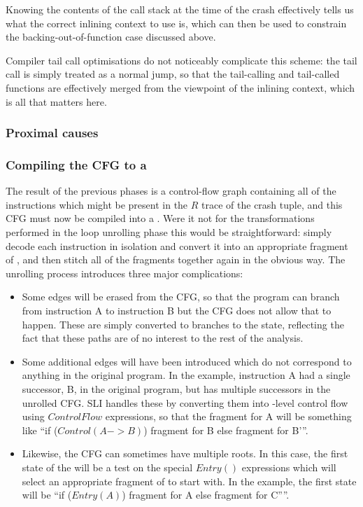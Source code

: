 Knowing the contents of the call stack at the time of the crash
effectively tells us what the correct inlining context to use is,
which can then be used to constrain the backing-out-of-function case
discussed above.

Compiler tail call optimisations do not noticeably complicate this
scheme: the tail call is simply treated as a normal jump, so that the
tail-calling and tail-called functions are effectively merged from the
viewpoint of the inlining context, which is all that matters here.

\subsubsection{Proximal causes}

\subsubsection{Compiling the CFG to a \StateMachine}

The result of the previous phases is a control-flow graph containing
all of the instructions which might be present in the $R$ trace of the
crash tuple, and this CFG must now be compiled into a \StateMachine.
Were it not for the transformations performed in the loop unrolling
phase this would be straightforward: simply decode each instruction in
isolation and convert it into an appropriate fragment of
\StateMachine, and then stitch all of the fragments together again in
the obvious way.  The unrolling process introduces three major
complications:

\begin{itemize}
\item
  Some edges will be erased from the CFG, so that the program can
  branch from instruction A to instruction B but the CFG does not
  allow that to happen.  These are simply converted to branches to the
   state, reflecting the fact that these paths are of
  no interest to the rest of the analysis.

\item
  Some additional edges will have been introduced which do not
  correspond to anything in the original program.  In the example,
  instruction A had a single successor, B, in the original program,
  but has multiple successors in the unrolled CFG.  SLI handles these
  by converting them into \StateMachine-level control flow using
  $ControlFlow$ expressions, so that the \StateMachine fragment for A
  will be something like ``if ($Control(A->B)$) {fragment for B} else
  {fragment for B'}''.

\item
  Likewise, the CFG can sometimes have multiple roots.  In this case,
  the first state of the \StateMachine will be a test on the special
  $Entry()$ expressions which will select an appropriate fragment of
  \StateMachine to start with.  In the example, the first state will
  be ``if ($Entry(A)$) {fragment for A} else { fragment for C''}''.
\end{itemize}

